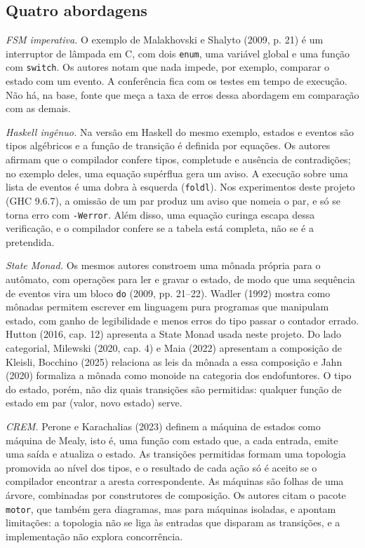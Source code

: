\documentclass[12pt,a4paper]{article}
\begin{document}
\subsection{Quatro abordagens}

\textit{FSM imperativa.} O exemplo de Malakhovski e Shalyto (2009, p. 21) é um interruptor de lâmpada em C, com dois \texttt{enum}, uma variável global e uma função com \texttt{switch}. Os autores notam que nada impede, por exemplo, comparar o estado com um evento. A conferência fica com os testes em tempo de execução. Não há, na base, fonte que meça a taxa de erros dessa abordagem em comparação com as demais.

\textit{Haskell ingênuo.} Na versão em Haskell do mesmo exemplo, estados e eventos são tipos algébricos e a função de transição é definida por equações. Os autores afirmam que o compilador confere tipos, completude e ausência de contradições; no exemplo deles, uma equação supérflua gera um aviso. A execução sobre uma lista de eventos é uma dobra à esquerda (\texttt{foldl}). Nos experimentos deste projeto (GHC 9.6.7), a omissão de um par produz um aviso que nomeia o par, e só se torna erro com \texttt{-Werror}. Além disso, uma equação curinga escapa dessa verificação, e o compilador confere se a tabela está completa, não se é a pretendida.

\textit{State Monad.} Os mesmos autores constroem uma mônada própria para o autômato, com operações para ler e gravar o estado, de modo que uma sequência de eventos vira um bloco \texttt{do} (2009, pp. 21--22). Wadler (1992) mostra como mônadas permitem escrever em linguagem pura programas que manipulam estado, com ganho de legibilidade e menos erros do tipo passar o contador errado. Hutton (2016, cap. 12) apresenta a State Monad usada neste projeto. Do lado categorial, Milewski (2020, cap. 4) e Maia (2022) apresentam a composição de Kleisli, Bocchino (2025) relaciona as leis da mônada a essa composição e Jahn (2020) formaliza a mônada como monoide na categoria dos endofuntores. O tipo do estado, porém, não diz quais transições são permitidas: qualquer função de estado em par (valor, novo estado) serve.

\textit{CREM.} Perone e Karachalias (2023) definem a máquina de estados como máquina de Mealy, isto é, uma função com estado que, a cada entrada, emite uma saída e atualiza o estado. As transições permitidas formam uma topologia promovida ao nível dos tipos, e o resultado de cada ação só é aceito se o compilador encontrar a aresta correspondente. As máquinas são folhas de uma árvore, combinadas por construtores de composição. Os autores citam o pacote \texttt{motor}, que também gera diagramas, mas para máquinas isoladas, e apontam limitações: a topologia não se liga às entradas que disparam as transições, e a implementação não explora concorrência.
\end{document}
